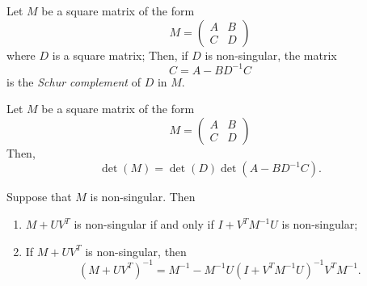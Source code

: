 \begin{definition}
    \label{def:schur}
    Let \(M\) be a square matrix of the form
    \[
        M =
        \begin{pmatrix}
            A & B \\
            C & D
        \end{pmatrix}
    \]
    where \(D\) is a square matrix; Then, if \(D\) is non-singular, the matrix
    \[
        C = A - B D^{-1} C
    \]
    is the \textit{Schur complement} of \(D\) in \(M\).
\end{definition}

\begin{theorem}
\label{thm:schur_formula}
  Let \(M\) be a square matrix of the form 
  \[
      M =
      \begin{pmatrix}
          A & B \\
          C & D
      \end{pmatrix}
  \]
  Then,
  \[
    \det(M) = \det(D)\det(A - BD^{-1}C).
  \]
\end{theorem}

\begin{theorem}
\label{thm:smw-formula}
  Suppose that \(M\) is non-singular. 
  Then
  \begin{enumerate}[label = (\arabic*)]
      \item \(M + UV^T\) is non-singular if and only if \(I + V^TM^{-1}U\) is non-singular;
      \item If \(M + UV^T\) is non-singular, then
      \[
          (M + UV^T)^{-1} = M^{-1} - M^{-1}U(I + V^TM^{-1}U)^{-1}V^TM^{-1}.
      \]
  \end{enumerate}
\end{theorem}

